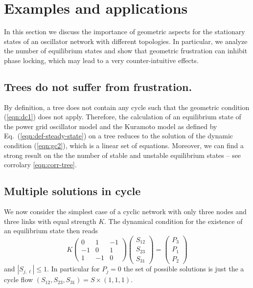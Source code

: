 \documentclass[10pt,aps,pra,onecolumn,superscriptaddress]{revtex4-1}
\newcommand{\be}{\begin{equation}}
\newcommand{\ee}{\end{equation}}
\begin{document}
\section{Examples and applications}

In this section we discuss the importance of geometric aspects 
for the stationary states of an oscillator network with different
topologies. In particular, we analyze the number of equilibrium
states and show that geometric frustration can inhibit phase 
locking, which may lead to a very counter-intuitive effects.


\subsection{Trees do not suffer from frustration.}

By definition, a tree does not contain any cycle such that
the geometric condition (\ref{eqn:dc1}) does not apply. 
Therefore, the calculation of an equilibrium state  of the 
power grid oscillator model and the Kuramoto model 
as defined by Eq.~(\ref{eqn:def-steady-state})
on a tree reduces to the solution of the dynamic condition 
(\ref{eqn:gc2}), which is a linear set of equations. 
Moreover, we can find a strong result on the 
the number of stable and unstable equilibrium 
states -- see corrolary \ref{eqn:corr-tree}.



\subsection{Multiple solutions in cycle}

We now consider the simplest case of a cyclic network with only 
three nodes and three links with equal strength $K$. The 
dynamical condition for the existence of an equilibrium state then
reads
\be
   K \begin{pmatrix} 0 & 1 & -1 \\ -1 & 0 & 1 \\ 1 & -1 & 0   
   \end{pmatrix}
   \begin{pmatrix} S_{12} \\ S_{23} \\ S_{31} \end{pmatrix}
  = \begin{pmatrix} P_3 \\ P_1 \\ P_2 \end{pmatrix}
    \label{eqn:3cycle-dc} 
\ee
 and $|S_{j,\ell}| \le 1$. In particular for $P_j = 0$ the
set of possible solutions is just the a cycle flow 
$(S_{12}, S_{23}, S_{31}) = S \times (1,1,1)$.
\end{document}

